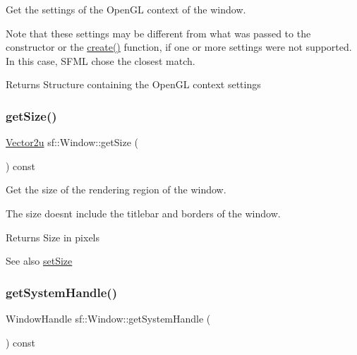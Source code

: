 Get the settings of the Open\+GL context of the window. 

Note that these settings may be different from what was passed to the constructor or the \mbox{\hyperlink{classsf_1_1_window_a30e6edf2162f8dbff61023b9de5d961d}{create()}} function, if one or more settings were not supported. In this case, S\+F\+ML chose the closest match.

\begin{DoxyReturn}{Returns}
Structure containing the Open\+GL context settings \begin{DoxyVerb}\end{DoxyVerb}
 
\end{DoxyReturn}
\mbox{\label{classsf_1_1_window_a3969926741cbe83d7f9eeaf5333d4e71}} 
\subsubsection{\texorpdfstring{getSize()}{getSize()}}
{\footnotesize\ttfamily \mbox{\hyperlink{classsf_1_1_vector2}{Vector2u}} sf\+::\+Window\+::get\+Size (\begin{DoxyParamCaption}{ }\end{DoxyParamCaption}) const}



Get the size of the rendering region of the window. 

The size doesn\textquotesingle{}t include the titlebar and borders of the window.

\begin{DoxyReturn}{Returns}
Size in pixels
\end{DoxyReturn}
\begin{DoxySeeAlso}{See also}
\mbox{\hyperlink{classsf_1_1_window_ab94ea32f22d15c0df11588e319de2546}{set\+Size}} \begin{DoxyVerb}\end{DoxyVerb}
 
\end{DoxySeeAlso}
\mbox{\label{classsf_1_1_window_ad2fa6be5104ec0bfe79af7a5f524ea90}} 
\subsubsection{\texorpdfstring{getSystemHandle()}{getSystemHandle()}}
{\footnotesize\ttfamily Window\+Handle sf\+::\+Window\+::get\+System\+Handle (\begin{DoxyParamCaption}{ }\end{DoxyParamCaption}) const}



